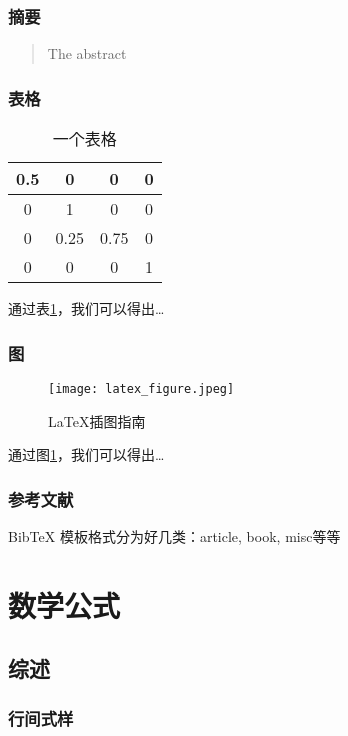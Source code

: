 \documentclass[a4paper,12pt]{article}
\begin{document}
\subsubsection{摘要}

\begin{abstract}
The abstract
\end{abstract}

\subsubsection{表格}

\begin{table}[!htp] %
\label{tab:1}
\centering
\begin{tabular}{|c|c|c|c|}
\hline
0.5&0&0&0\\
\hline
0&1&0&0\\
\hline
0&0.25&0.75&0\\
\hline
0&0&0&1\\
\hline
\end{tabular}  
\caption{一个表格}
\end{table}
通过表\ref{tab:1}，我们可以得出\ldots

\subsubsection{图}

\begin{figure}[!htb] %
\centering
\texttt{[image: latex\_figure.jpeg]}
\caption{\LaTeX{}插图指南}
\label{fig:1}
\end{figure}
通过图\ref{fig:1}，我们可以得出\ldots

\subsubsection{参考文献}

BibTeX 模板格式分为好几类：article\cite{1:article}, book\cite{2:book}, misc\cite{3:misc}等等 

\section{数学公式}

\subsection{综述}

\subsubsection{行间式样}
\end{document}
